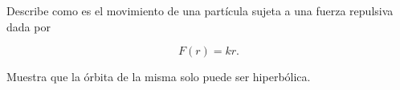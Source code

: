 \documentclass[../main.tex]{subfiles}
\begin{document}
\begin{problema}
	Describe como es el movimiento de una partícula sujeta a
	una fuerza repulsiva dada por

	\begin{equation}
		F(r) = kr.
	\end{equation}

	Muestra que la órbita de la misma solo puede ser hiperbólica.
\end{problema}
\end{document}
